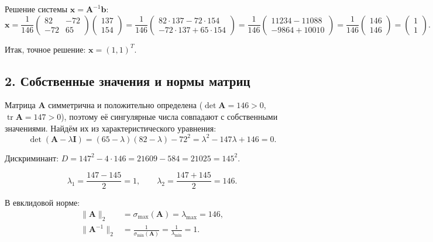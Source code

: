 \documentclass{article}
\begin{document}
Решение системы $\mathbf{x} = \mathbf{A}^{-1}\mathbf{b}$:
\begin{equation}
\mathbf{x} = \frac{1}{146} \begin{pmatrix} 82 & -72 \\ -72 & 65 \end{pmatrix} \begin{pmatrix} 137 \\ 154 \end{pmatrix} = \frac{1}{146} \begin{pmatrix} 82 \cdot 137 - 72 \cdot 154 \\ -72 \cdot 137 + 65 \cdot 154 \end{pmatrix} = \frac{1}{146} \begin{pmatrix} 11234 - 11088 \\ -9864 + 10010 \end{pmatrix} = \frac{1}{146} \begin{pmatrix} 146 \\ 146 \end{pmatrix} = \begin{pmatrix} 1 \\ 1 \end{pmatrix}.
\end{equation}

Итак, точное решение: $\mathbf{x} = (1, 1)^T$.

\subsection*{2. Собственные значения и нормы матриц}

Матрица $\mathbf{A}$ симметрична и положительно определена ($\det \mathbf{A} = 146 > 0$, $\operatorname{tr} \mathbf{A} = 147 > 0$), поэтому её сингулярные числа совпадают с собственными значениями. Найдём их из характеристического уравнения:
\begin{equation}
\det(\mathbf{A} - \lambda \mathbf{I}) = (65 - \lambda)(82 - \lambda) - 72^2 = \lambda^2 - 147\lambda + 146 = 0.
\end{equation}

Дискриминант: $D = 147^2 - 4 \cdot 146 = 21609 - 584 = 21025 = 145^2$.

\begin{equation}
\lambda_1 = \frac{147 - 145}{2} = 1, \qquad \lambda_2 = \frac{147 + 145}{2} = 146.
\end{equation}

В евклидовой норме:
\begin{align}
\|\mathbf{A}\|_2 &= \sigma_{\max}(\mathbf{A}) = \lambda_{\max} = 146, \\
\|\mathbf{A}^{-1}\|_2 &= \frac{1}{\sigma_{\min}(\mathbf{A})} = \frac{1}{\lambda_{\min}} = 1.
\end{align}
\end{document}
